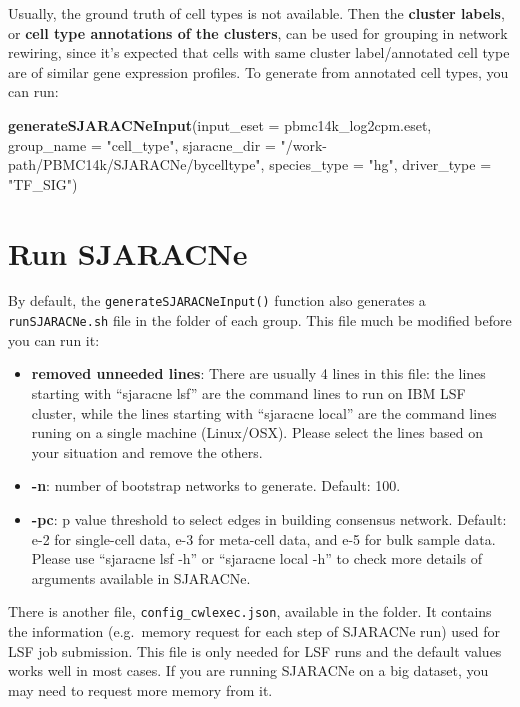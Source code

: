 \documentclass[
  12pt,
]{book}
\newenvironment{Shaded}{\begin{snugshade}}{\end{snugshade}}
\newcommand{\AttributeTok}[1]{\textcolor[rgb]{0.13,0.29,0.53}{#1}}
\newcommand{\FunctionTok}[1]{\textcolor[rgb]{0.13,0.29,0.53}{\textbf{#1}}}
\newcommand{\NormalTok}[1]{#1}
\newcommand{\StringTok}[1]{\textcolor[rgb]{0.31,0.60,0.02}{#1}}
\providecommand{\tightlist}{%
  \setlength{\itemsep}{0pt}\setlength{\parskip}{0pt}}
\begin{document}
Usually, the ground truth of cell types is not available. Then the \textbf{cluster labels}, or \textbf{cell type annotations of the clusters}, can be used for grouping in network rewiring, since it's expected that cells with same cluster label/annotated cell type are of similar gene expression profiles. To generate from annotated cell types, you can run:

\begin{Shaded}
\begin{Highlighting}[]
\FunctionTok{generateSJARACNeInput}\NormalTok{(}\AttributeTok{input\_eset =}\NormalTok{ pbmc14k\_log2cpm.eset, }\AttributeTok{group\_name =} \StringTok{"cell\_type"}\NormalTok{, }\AttributeTok{sjaracne\_dir =} \StringTok{"/work{-}path/PBMC14k/SJARACNe/bycelltype"}\NormalTok{, }\AttributeTok{species\_type =} \StringTok{"hg"}\NormalTok{, }\AttributeTok{driver\_type =} \StringTok{"TF\_SIG"}\NormalTok{)}
\end{Highlighting}
\end{Shaded}

\section{Run SJARACNe}\label{run-sjaracne}

By default, the \texttt{generateSJARACNeInput()} function also generates a \texttt{runSJARACNe.sh} file in the folder of each group. This file much be modified before you can run it:

\begin{itemize}
\tightlist
\item
  \textbf{removed unneeded lines}: There are usually 4 lines in this file: the lines starting with ``sjaracne lsf'' are the command lines to run on IBM LSF cluster, while the lines starting with ``sjaracne local'' are the command lines runing on a single machine (Linux/OSX). Please select the lines based on your situation and remove the others.
\item
  \textbf{-n}: number of bootstrap networks to generate. Default: 100.
\item
  \textbf{-pc}: p value threshold to select edges in building consensus network. Default: e-2 for single-cell data, e-3 for meta-cell data, and e-5 for bulk sample data.
  Please use ``sjaracne lsf -h'' or ``sjaracne local -h'' to check more details of arguments available in SJARACNe.
\end{itemize}

There is another file, \texttt{config\_cwlexec.json}, available in the folder. It contains the information (e.g.~memory request for each step of SJARACNe run) used for LSF job submission. This file is only needed for LSF runs and the default values works well in most cases. If you are running SJARACNe on a big dataset, you may need to request more memory from it.
\end{document}
